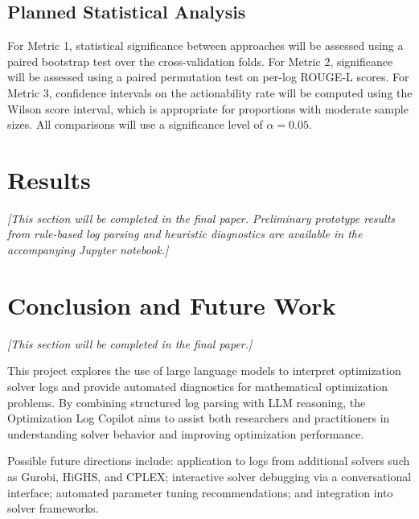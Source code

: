 \documentclass[11pt]{article}
\begin{document}
\subsection{Planned Statistical Analysis}

For Metric 1, statistical significance between approaches will be assessed using a paired bootstrap test over the cross-validation folds. For Metric 2, significance will be assessed using a paired permutation test on per-log ROUGE-L scores. For Metric 3, confidence intervals on the actionability rate will be computed using the Wilson score interval, which is appropriate for proportions with moderate sample sizes. All comparisons will use a significance level of $\alpha = 0.05$.

\section{Results}
\label{sec:results}

\textit{[This section will be completed in the final paper. Preliminary prototype results from rule-based log parsing and heuristic diagnostics are available in the accompanying Jupyter notebook.]}

\section{Conclusion and Future Work}
\label{sec:conclusion}

\textit{[This section will be completed in the final paper.]}

This project explores the use of large language models to interpret optimization solver logs and provide automated diagnostics for mathematical optimization problems. By combining structured 
log parsing with LLM reasoning, the Optimization Log Copilot aims to assist both researchers and practitioners in understanding solver behavior and improving optimization performance.

Possible future directions include: application to logs from additional solvers such as Gurobi, HiGHS, and CPLEX; interactive solver debugging via a conversational interface; automated parameter tuning recommendations; and 
integration into solver frameworks.
\end{document}

